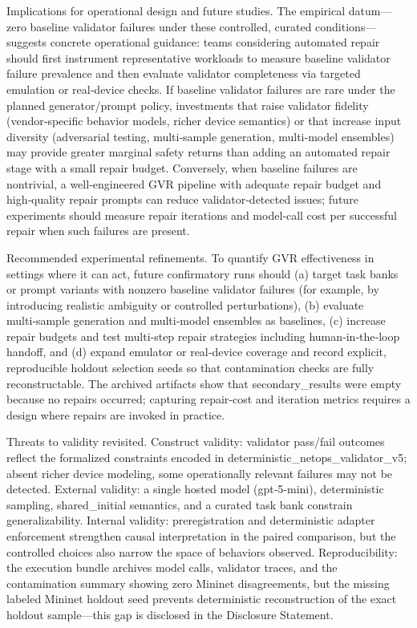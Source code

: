 \documentclass[conference]{IEEEtran}
\begin{document}
Implications for operational design and future studies. The empirical datum---zero baseline validator failures under these controlled, curated conditions---suggests concrete operational guidance: teams considering automated repair should first instrument representative workloads to measure baseline validator failure prevalence and then evaluate validator completeness via targeted emulation or real‑device checks. If baseline validator failures are rare under the planned generator/prompt policy, investments that raise validator fidelity (vendor‑specific behavior models, richer device semantics) or that increase input diversity (adversarial testing, multi‑sample generation, multi‑model ensembles) may provide greater marginal safety returns than adding an automated repair stage with a small repair budget. Conversely, when baseline failures are nontrivial, a well‑engineered GVR pipeline with adequate repair budget and high‑quality repair prompts can reduce validator‑detected issues; future experiments should measure repair iterations and model‑call cost per successful repair when such failures are present.

Recommended experimental refinements. To quantify GVR effectiveness in settings where it can act, future confirmatory runs should (a) target task banks or prompt variants with nonzero baseline validator failures (for example, by introducing realistic ambiguity or controlled perturbations), (b) evaluate multi‑sample generation and multi‑model ensembles as baselines, (c) increase repair budgets and test multi‑step repair strategies including human‑in‑the‑loop handoff, and (d) expand emulator or real‑device coverage and record explicit, reproducible holdout selection seeds so that contamination checks are fully reconstructable. The archived artifacts show that secondary\_results were empty because no repairs occurred; capturing repair‑cost and iteration metrics requires a design where repairs are invoked in practice.

Threats to validity revisited. Construct validity: validator pass/fail outcomes reflect the formalized constraints encoded in deterministic\_netops\_validator\_v5; absent richer device modeling, some operationally relevant failures may not be detected. External validity: a single hosted model (gpt‑5‑mini), deterministic sampling, shared\_initial semantics, and a curated task bank constrain generalizability. Internal validity: preregistration and deterministic adapter enforcement strengthen causal interpretation in the paired comparison, but the controlled choices also narrow the space of behaviors observed. Reproducibility: the execution bundle archives model calls, validator traces, and the contamination summary showing zero Mininet disagreements, but the missing labeled Mininet holdout seed prevents deterministic reconstruction of the exact holdout sample---this gap is disclosed in the Disclosure Statement.
\end{document}
